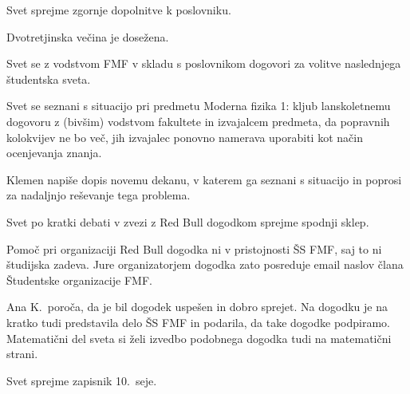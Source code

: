 \documentclass{seja}
\begin{document}
\begin{ad}
\begin{sklep*}
Svet sprejme zgornje dopolnitve k poslovniku.
\end{sklep*}
Dvotretjinska večina je dosežena.

\item Svet se z vodstvom FMF v skladu s poslovnikom dogovori za volitve
naslednjega študentska sveta.

\item Svet se seznani s situacijo pri predmetu Moderna fizika 1: kljub
lanskoletnemu dogovoru z (bivšim) vodstvom fakultete in izvajalcem predmeta, da
popravnih kolokvijev ne bo več, jih izvajalec ponovno namerava uporabiti kot
način ocenjevanja znanja.

\begin{sklep*}
Klemen napiše dopis novemu dekanu, v katerem ga seznani s situacijo in poprosi
za nadaljnjo reševanje tega problema.
\end{sklep*}

\item Svet po kratki debati v zvezi z Red Bull dogodkom sprejme spodnji sklep.
\begin{sklep*}
Pomoč pri organizaciji Red Bull dogodka ni v pristojnosti ŠS FMF, saj to ni
študijska zadeva. Jure organizatorjem dogodka zato posreduje email naslov člana
Študentske organizacije FMF.
\end{sklep*}

\item Ana K.~poroča, da je bil dogodek uspešen in dobro sprejet. Na dogodku je
na kratko tudi predstavila delo ŠS FMF in podarila, da take dogodke podpiramo.
Matematični del sveta si želi izvedbo podobnega dogodka tudi na matematični
strani.

\item
\begin{sklep*}
Svet sprejme zapisnik 10.~seje.
\end{sklep*}
\end{ad}

\makeatletter \global\let\@enddocumenthook\@empty \makeatother
{}
\end{document}
